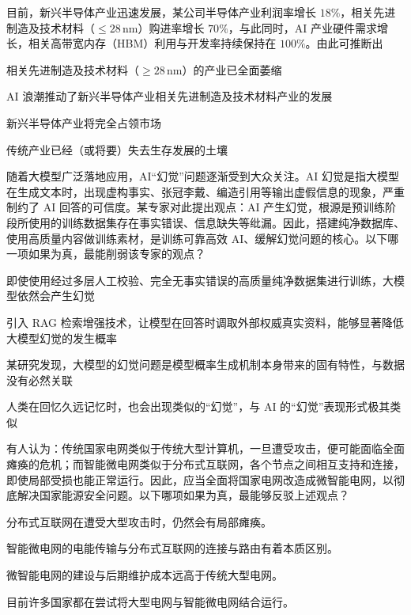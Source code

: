 \documentclass{exam-zh}
\begin{document}
\begin{question}
目前，新兴半导体产业迅速发展，某公司半导体产业利润率增长 $18\%$，相关先进制造及技术材料（$\le 28\,\mathrm{nm}$）购进率增长 $70\%$，与此同时，AI 产业硬件需求增长，相关高带宽内存（HBM）利用与开发率持续保持在 $100\%$。由此可推断出 \paren[]
\begin{choices}
  \item 相关先进制造及技术材料（$\ge 28\,\mathrm{nm}$）的产业已全面萎缩
  \item AI 浪潮推动了新兴半导体产业相关先进制造及技术材料产业的发展
  \item 新兴半导体产业将完全占领市场
  \item 传统产业已经（或将要）失去生存发展的土壤
\end{choices}
\end{question}

\begin{question}
随着大模型广泛落地应用，AI“幻觉”问题逐渐受到大众关注。AI 幻觉是指大模型在生成文本时，出现虚构事实、张冠李戴、编造引用等输出虚假信息的现象，严重制约了 AI 回答的可信度。某专家对此提出观点：AI 产生幻觉，根源是预训练阶段所使用的训练数据集存在事实错误、信息缺失等纰漏。因此，搭建纯净数据库、使用高质量内容做训练素材，是训练可靠高效 AI、缓解幻觉问题的核心。以下哪一项如果为真，最能削弱该专家的观点？\paren[]
\begin{choices}
  \item 即使使用经过多层人工校验、完全无事实错误的高质量纯净数据集进行训练，大模型依然会产生幻觉
  \item 引入 RAG 检索增强技术，让模型在回答时调取外部权威真实资料，能够显著降低大模型幻觉的发生概率
  \item 某研究发现，大模型的幻觉问题是模型概率生成机制本身带来的固有特性，与数据没有必然关联
  \item 人类在回忆久远记忆时，也会出现类似的“幻觉”，与 AI 的“幻觉”表现形式极其类似
\end{choices}
\end{question}

\begin{question}
有人认为：传统国家电网类似于传统大型计算机，一旦遭受攻击，便可能面临全面瘫痪的危机；而智能微电网类似于分布式互联网，各个节点之间相互支持和连接，即使局部受损也能正常运行。因此，应当全面将国家电网改造成微智能电网，以彻底解决国家能源安全问题。以下哪项如果为真，最能够反驳上述观点？\paren[]
\begin{choices}
  \item 分布式互联网在遭受大型攻击时，仍然会有局部瘫痪。
  \item 智能微电网的电能传输与分布式互联网的连接与路由有着本质区别。
  \item 微智能电网的建设与后期维护成本远高于传统大型电网。
  \item 目前许多国家都在尝试将大型电网与智能微电网结合运行。
\end{choices}
\end{question}
\end{document}
